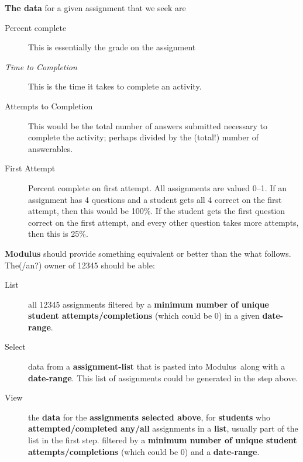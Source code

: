 \documentclass{techbrief}
\newcommand{\modulus}{\textsf{Modulus}}
\begin{document}
\begin{xframe}
    \textbf{The data} for a given assignment that we seek are
    \begin{description}
        \item[Percent complete] This is essentially the grade on the assignment
        \item[\textit{Time to Completion}] This is the time it takes to
            complete an
            activity.
        \item[Attempts to Completion] This would be the total number of answers
            submitted necessary to complete the activity; perhaps divided by
            the (total!) number of answerables.
        \item[First Attempt] Percent complete on first
            attempt. All assignments are valued
            0--1. If an assignment has 4 questions and a student gets
            all 4 correct on the first attempt, then this would be 100\%. If
            the student gets the first question correct on the first attempt,
            and every other question takes more attempts, then this is 25\%.
    \end{description}
\end{xframe}

\begin{xframe}
\textbf{\modulus} should provide something equivalent or better than the
what follows. The(/an?) owner of 12345 should be able:
\begin{description}
\item[List] all 12345 assignments filtered by a \textbf{minimum number
    of unique student attempts/completions} (which could be 0) in a
given \textbf{date-range}.
\item[Select] data from a \textbf{assignment-list} that is pasted into
\modulus\ along with a \textbf{date-range}. This list of assignments could be
generated in the step above.
\item[View] the \textbf{data} for the \textbf{assignments selected above}, 
for \textbf{students} who \textbf{attempted/completed any/all} assignments in a \textbf{list}, usually part of the list in the first step.
filtered by a \textbf{minimum number
of unique student attempts/completions} (which could be 0) and a \textbf{date-range}.
\end{description}
\end{xframe}
\end{document}
